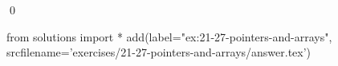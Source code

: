 
\begin{ex}
  \label{ex:21-27-pointers-and-arrays}
  
  \qed
\end{ex}
\begin{python0}
from solutions import *
add(label="ex:21-27-pointers-and-arrays",
    srcfilename='exercises/21-27-pointers-and-arrays/answer.tex')
\end{python0}
